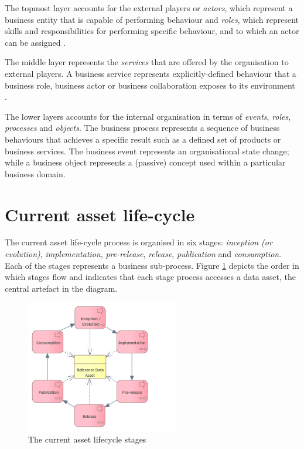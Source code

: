 	The topmost layer accounts for the external players or \textit{actors}, which represent a business entity that is capable of performing behaviour and \textit{roles}, which represent skills and responsibilities for performing specific behaviour, and to which an actor can be assigned \citep{archimate3.1}. 
	
	The middle layer represents the \textit{services} that are offered by the organisation to external players. A business service represents explicitly-defined behaviour that a business role, business actor or business collaboration exposes to its environment \citep{archimate3.1}.
	
	The lower layers accounts for the internal organisation in terms of \textit{events}, \textit{roles}, \textit{processes} and \textit{objects}. The business process represents a sequence of business behaviours that achieves a specific result such as a defined set of products or business services. The business event represents an organisational state change; while a business object represents a (passive) concept used within a particular business domain.
	
	\section{Current asset life-cycle}
	\label{sec:lifecycle-current-stages}
	
	The current asset life-cycle process is organised in six stages: \textit{inception (or evolution)}, \textit{implementation}, \textit{pre-release}, \textit{release}, \textit{publication} and \textit{consumption}. Each of the stages represents a business sub-process. Figure \ref{fig:lifecycle-current-stages} depicts the order in which stages flow and indicates that each stage process accesses a data asset, the central artefact in the diagram.
	
	\begin{figure}[h]
		\centering
		\includegraphics[width=0.6\textwidth]{images/business/Lifecycle process only (current).png}
		\caption{The current asset lifecycle stages}
		\label{fig:lifecycle-current-stages}
	\end{figure} 

